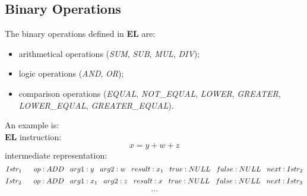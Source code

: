 \subsection*{Binary Operations}
The binary operations defined in \textbf{EL} are:
\begin{itemize}
\item arithmetical operations (\emph{SUM}, \emph{SUB}, \emph{MUL}, \emph{DIV});
\item logic operations (\emph{AND}, \emph{OR});
\item comparison operations (\emph{EQUAL}, \emph{NOT\_EQUAL}, \emph{LOWER}, \emph{GREATER}, \emph{LOWER\_EQUAL}, \emph{GREATER\_EQUAL}).
\end{itemize}
An example is:\\
\textbf{EL} instruction: \[x=y+w+z\]
intermediate representation: \[Istr_1\;\;\;\;\;\; op:ADD\;\;\; arg1:y\;\;\; arg2:w\;\;\; result:x_1\;\;\; true:NULL\;\;\; false:NULL\;\;\; next:Istr_2\]
\[Istr_2\;\;\;\;\;\; op:ADD\;\;\; arg1:x_1\;\;\; arg2:z\;\;\; result:x\;\;\; true:NULL\;\;\; false:NULL\;\;\; next:Istr_3\]
\[\ldots\] 